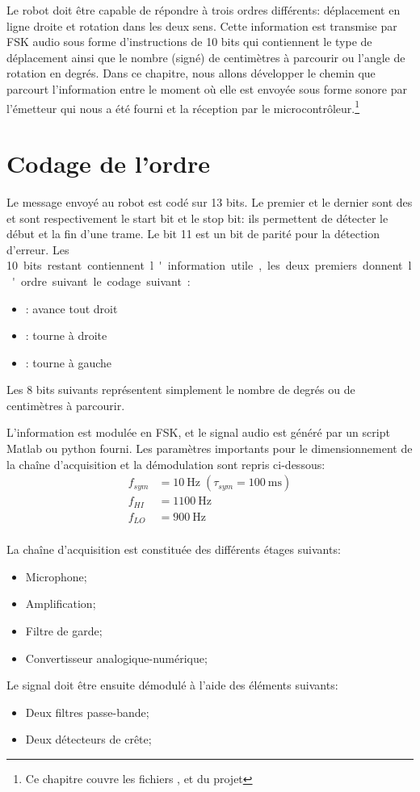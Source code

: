 Le robot doit être capable de répondre à trois ordres différents: déplacement en ligne droite et rotation dans les deux sens. Cette information est transmise par FSK audio sous forme d'instructions de 10 bits qui contiennent le type de déplacement ainsi que le nombre (signé) de centimètres à parcourir ou l'angle de rotation en degrés. Dans ce chapitre, nous allons développer le chemin que parcourt l'information entre le moment où elle est envoyée sous forme sonore par l'émetteur qui nous a été fourni et la réception par le microcontrôleur.\footnote{Ce chapitre couvre les fichiers ,  et  du projet }

\section{Codage de l'ordre}
Le message envoyé au robot est codé sur 13 bits. Le premier et le dernier sont des  et sont respectivement le start bit et le stop bit: ils permettent de détecter le début et la fin d'une trame. Le bit 11 est un bit de parité pour la détection d'erreur. Les \SI{10} bits restant contiennent l'information utile, les deux premiers donnent l'ordre suivant le codage suivant:
\begin{itemize}
\item {}: avance tout droit
\item {}: tourne à droite
\item {}: tourne à gauche
\end{itemize}
Les 8 bits suivants représentent simplement le nombre de degrés ou de centimètres à parcourir.

L'information est modulée en FSK, et le signal audio est généré par un script Matlab ou python fourni. Les paramètres importants pour le dimensionnement de la chaîne d'acquisition et la démodulation sont repris ci-dessous:
\begin{align*}
f_{sym} &= \SI{10}{\hertz} \;(\tau_{sym} = \SI{100}{\milli\second})\\
f_{HI} &= \SI{1100}{\hertz}\\
f_{LO} &= \SI{900}{\hertz}\\
\end{align*}

La chaîne d'acquisition est constituée des différents étages suivants:
\begin{itemize}
\item Microphone;
\item Amplification;
\item Filtre de garde;
\item Convertisseur analogique-numérique;
\end{itemize}
Le signal doit être ensuite démodulé à l'aide des éléments suivants:
\begin{itemize}
\item Deux filtres passe-bande;
\item Deux détecteurs de crête;
\end{itemize}

